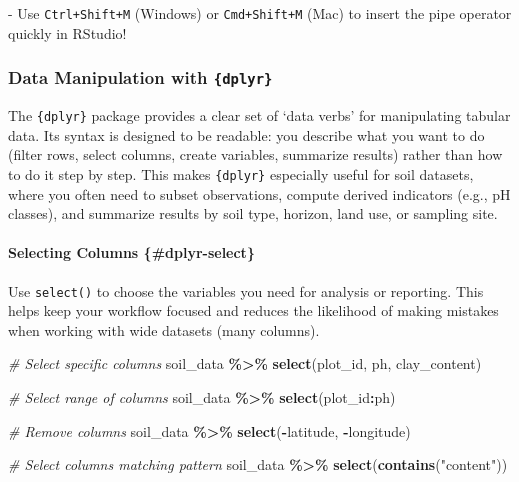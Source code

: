 \documentclass[
  10pt,
  b5paper,
  oneside]{book}
\newenvironment{Shaded}{\begin{snugshade}}{\end{snugshade}}
\newcommand{\CommentTok}[1]{\textcolor[rgb]{0.56,0.35,0.01}{\textit{#1}}}
\newcommand{\FunctionTok}[1]{\textcolor[rgb]{0.13,0.29,0.53}{\textbf{#1}}}
\newcommand{\NormalTok}[1]{#1}
\newcommand{\SpecialCharTok}[1]{\textcolor[rgb]{0.81,0.36,0.00}{\textbf{#1}}}
\newcommand{\StringTok}[1]{\textcolor[rgb]{0.31,0.60,0.02}{#1}}
\begin{document}
-️ Use \texttt{Ctrl+Shift+M} (Windows) or \texttt{Cmd+Shift+M} (Mac) to insert the pipe operator quickly in RStudio!

\subsubsection{\texorpdfstring{Data Manipulation with \texttt{\{dplyr\}}}{Data Manipulation with \{dplyr\}}}\label{manipulation-dplyr}

The \texttt{\{dplyr\}} package provides a clear set of `data verbs' for manipulating tabular data. Its syntax is designed to be readable: you describe what you want to do (filter rows, select columns, create variables, summarize results) rather than how to do it step by step. This makes \texttt{\{dplyr\}} especially useful for soil datasets, where you often need to subset observations, compute derived indicators (e.g., pH classes), and summarize results by soil type, horizon, land use, or sampling site.

\paragraph*{Selecting Columns \{\#dplyr-select\}}\label{selecting-columns-dplyr-select}

Use \texttt{select()} to choose the variables you need for analysis or reporting. This helps keep your workflow focused and reduces the likelihood of making mistakes when working with wide datasets (many columns).

\begin{Shaded}
\begin{Highlighting}[]
\CommentTok{\# Select specific columns}
\NormalTok{soil\_data }\SpecialCharTok{\%\textgreater{}\%}
  \FunctionTok{select}\NormalTok{(plot\_id, ph, clay\_content)}

\CommentTok{\# Select range of columns}
\NormalTok{soil\_data }\SpecialCharTok{\%\textgreater{}\%}
  \FunctionTok{select}\NormalTok{(plot\_id}\SpecialCharTok{:}\NormalTok{ph)}

\CommentTok{\# Remove columns}
\NormalTok{soil\_data }\SpecialCharTok{\%\textgreater{}\%}
  \FunctionTok{select}\NormalTok{(}\SpecialCharTok{{-}}\NormalTok{latitude, }\SpecialCharTok{{-}}\NormalTok{longitude)}

\CommentTok{\# Select columns matching pattern}
\NormalTok{soil\_data }\SpecialCharTok{\%\textgreater{}\%}
  \FunctionTok{select}\NormalTok{(}\FunctionTok{contains}\NormalTok{(}\StringTok{"content"}\NormalTok{))}
\end{Highlighting}
\end{Shaded}
\end{document}
